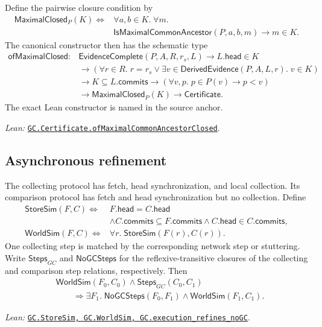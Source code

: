 \documentclass[11pt]{article}
\theoremstyle{definition}
\newcommand{\src}[2]{\href{../../#1}{\texttt{#2}}}
\newcommand{\anchor}[2]{\par\smallskip\noindent\emph{Lean: }\src{#1}{#2}.}
\begin{document}
Define the pairwise closure condition by
\[
\begin{aligned}
 \mathsf{MaximalClosed}_P(K)\Longleftrightarrow{}&
   \forall a,b\in K.\;\forall m.\\
 &\mathsf{IsMaximalCommonAncestor}(P,a,b,m)\to m\in K.
\end{aligned}
\]
The canonical constructor then has the schematic type
\[
\begin{aligned}
 \mathsf{ofMaximalClosed}:{}&
 \mathsf{EvidenceComplete}(P,A,R,r_s,L)
 \to L.\mathsf{head}\in K\\
 &\to(\forall r\in R.\;r=r_s\lor
   \exists v\in\mathsf{DerivedEvidence}(P,A,L,r).\;v\in K)\\
 &\to K\subseteq L.\mathsf{commits}
 \to(\forall v,p.\;p\in P(v)\to p<v)\\
 &\to\mathsf{MaximalClosed}_P(K)
 \to\mathsf{Certificate}.
\end{aligned}
\]
The exact Lean constructor is named in the source anchor.
\anchor{Sal/MRDTs/GC/Distributed.lean}
  {GC.Certificate.\allowbreak ofMaximalCommonAncestorClosed}

\subsection{Asynchronous refinement}

The collecting protocol has fetch, head synchronization, and local
collection. Its comparison protocol has fetch and head synchronization but no
collection. Define
\[
\begin{aligned}
 \mathsf{StoreSim}(F,C)\Longleftrightarrow{}&
 F.\mathsf{head}=C.\mathsf{head}\\
 &\land C.\mathsf{commits}\subseteq F.\mathsf{commits}
 \land C.\mathsf{head}\in C.\mathsf{commits},\\
 \mathsf{WorldSim}(F,C)\Longleftrightarrow{}&
 \forall r.\;\mathsf{StoreSim}(F(r),C(r)).
\end{aligned}
\]
One collecting step is matched by the corresponding network step or
stuttering. Write $\mathsf{Steps}_{GC}$ and $\mathsf{NoGCSteps}$ for the
reflexive-transitive closures of the collecting and comparison step relations,
respectively. Then
\[
\begin{aligned}
 &\mathsf{WorldSim}(F_0,C_0)\land\mathsf{Steps}_{GC}(C_0,C_1)\\
 &\qquad\Longrightarrow\exists F_1.\;
 \mathsf{NoGCSteps}(F_0,F_1)\land\mathsf{WorldSim}(F_1,C_1).
\end{aligned}
\]
\anchor{Sal/MRDTs/GC/Distributed.lean}
  {GC.StoreSim, GC.WorldSim, GC.execution\_refines\_noGC}
\end{document}
